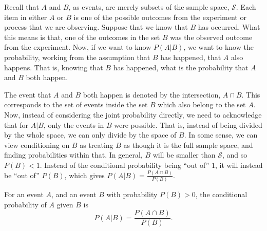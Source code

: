 \documentclass[
  letterpaper,
  DIV=11,
  numbers=noendperiod]{scrreprt}
\theoremstyle{definition}
\theoremstyle{definition}
\theoremstyle{definition}
\theoremstyle{remark}
\begin{document}
Recall that \(A\) and \(B\), as events, are merely subsets of the sample
space, \(\mathcal{S}\). Each item in either \(A\) or \(B\) is one of the
possible outcomes from the experiment or process that we are observing.
Suppose that we know that \(B\) has occurred. What this means is that,
one of the outcomes in the set \(B\) was the observed outcome from the
experiment. Now, if we want to know \(P(A|B)\), we want to know the
probability, working from the assumption that \(B\) has happened, that
\(A\) also happens. That is, knowing that \(B\) has happened, what is
the probability that \(A\) and \(B\) both happen.

The event that \(A\) and \(B\) both happen is denoted by the
intersection, \(A \cap B\). This corresponds to the set of events inside
the set \(B\) which also belong to the set \(A\). Now, instead of
considering the joint probability directly, we need to acknowledge that
for \(A|B\), only the events in \(B\) were possible. That is, instead of
being divided by the whole space, we can only divide by the space of
\(B\). In some sense, we can view conditioning on \(B\) as treating
\(B\) as though it is the full sample space, and finding probabilities
within that. In general, \(B\) will be smaller than \(\mathcal{S}\), and
so \(P(B) < 1\). Instead of the conditional probability being ``out of''
\(1\), it will instead be ``out of'' \(P(B)\), which gives
\(P(A|B) = \frac{P(A\cap B)}{P(B)}\).

\begin{tcolorbox}[enhanced jigsaw, coltitle=black, colframe=quarto-callout-tip-color-frame, colbacktitle=quarto-callout-tip-color!10!white, bottomrule=.15mm, opacitybacktitle=0.6, colback=white, toptitle=1mm, arc=.35mm, leftrule=.75mm, bottomtitle=1mm, opacityback=0, breakable, rightrule=.15mm, title={Computing Conditional Probabilities}, left=2mm, titlerule=0mm, toprule=.15mm]

For an event \(A\), and an event \(B\) with probability \(P(B) > 0\),
the conditional probability of \(A\) given \(B\) is
\[P(A|B) = \frac{P(A\cap B)}{P(B)}.\]

\end{tcolorbox}
\end{document}
